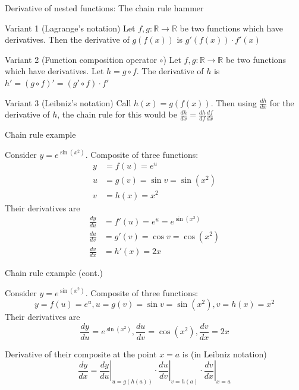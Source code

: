 \documentclass[12pt,aspectratio=169]{beamer}
\begin{document}
\begin{frame}{Derivative of nested functions: The chain rule hammer}


\begin{block}{Variant 1 (Lagrange's notation)}
Let $f, g : \mathbb{R} \to \mathbb{R}$ be two functions which have derivatives. Then the derivative of $g (f(x))$ is $g' (f(x)) \cdot f' (x)$
\end{block}
\pause

\begin{block}{Variant 2 (Function composition operator $\circ$)}
Let $f, g : \mathbb{R} \to \mathbb{R}$ be two functions which have derivatives. Let $h = g \circ f$. The derivative of $h$ is $h'=(g \circ f)'=(g'\circ f)\cdot f'$
\end{block}
\pause

\begin{block}{Variant 3 (Leibniz's notation)}
Call $h(x) = g(f(x))$. Then using $\frac{dh}{dx}$ for the derivative of $h$, the chain rule for this would be $\frac{dh}{dx} = \frac{dh}{df} \frac{df}{dx}$
\end{block}

\end{frame}


\begin{frame}{Chain rule example}

Consider $y=e^{\sin(x^{2})}$. Composite of three functions:
$$
\begin{aligned}
y &= f(u) = e^u \\
u &= g(v) = \sin v = \sin (x^2) \\
v &= h(x) = x^2
\end{aligned}
$$
\pause
Their derivatives are
$$
\begin{aligned}
\frac{dy}{du} &= f'(u) = e^u = e^{\sin(x^{2})} \\
\frac{du}{dv} &= g'(v) = \cos v = \cos (x^2) \\
\frac{dv}{dx} &= h'(x) = 2x
\end{aligned}
$$
\end{frame}


\begin{frame}{Chain rule example (cont.)}
	
Consider $y=e^{\sin(x^{2})}$. Composite of three functions:
$$y = f(u) = e^u, u = g(v) = \sin v = \sin (x^2), v = h(x) = x^2$$
Their derivatives are
$$\frac{dy}{du} = e^{\sin(x^{2})}, \frac{du}{dv} = \cos (x^2), \frac{dv}{dx} = 2x$$

\pause

Derivative of their composite at the point $x = a$ is (in Leibniz notation)
$$
{\frac {dy}{dx}}=\left.{\frac {dy}{du}}\right|_{u=g(h(a))}\cdot \left.{\frac {du}{dv}}\right|_{v=h(a)}\cdot \left.{\frac {dv}{dx}}\right|_{x=a}
$$
	
\end{frame}
\end{document}
